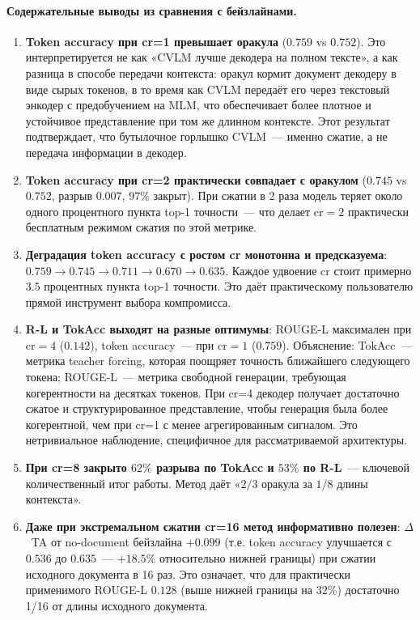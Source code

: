 \documentclass[a4paper,12pt]{extarticle}
\begin{document}
\paragraph{Содержательные выводы из сравнения с бейзлайнами.}
\begin{enumerate}
    \item \textbf{Token accuracy при cr=1 превышает оракула} ($0.759$ vs $0.752$). Это интерпретируется не как «CVLM лучше декодера на полном тексте», а как разница в способе передачи контекста: оракул кормит документ декодеру в виде сырых токенов, в то время как CVLM передаёт его через текстовый энкодер с предобучением на MLM, что обеспечивает более плотное и устойчивое представление при том же длинном контексте. Этот результат подтверждает, что бутылочное горлышко CVLM~--- именно сжатие, а не передача информации в декодер.

    \item \textbf{Token accuracy при cr=2 практически совпадает с оракулом} ($0.745$ vs $0.752$, разрыв $0.007$, $97\%$ закрыт). При сжатии в 2 раза модель теряет около одного процентного пункта top-1 точности~--- что делает $\text{cr}=2$ практически бесплатным режимом сжатия по этой метрике.

    \item \textbf{Деградация token accuracy с ростом cr монотонна и предсказуема}: $0.759 \to 0.745 \to 0.711 \to 0.670 \to 0.635$. Каждое удвоение cr стоит примерно $3.5$ процентных пункта top-1 точности. Это даёт практическому пользователю прямой инструмент выбора компромисса.

    \item \textbf{R-L и TokAcc выходят на разные оптимумы}: ROUGE-L максимален при $\text{cr}=4$ ($0.142$), token accuracy~--- при $\text{cr}=1$ ($0.759$). Объяснение: TokAcc~--- метрика teacher forcing, которая поощряет точность ближайшего следующего токена; ROUGE-L~--- метрика свободной генерации, требующая когерентности на десятках токенов. При cr=4 декодер получает достаточно сжатое и структурированное представление, чтобы генерация была более когерентной, чем при cr=1 с менее агрегированным сигналом. Это нетривиальное наблюдение, специфичное для рассматриваемой архитектуры.

    \item \textbf{При cr=8 закрыто $62\%$ разрыва по TokAcc и $53\%$ по R-L}~--- ключевой количественный итог работы. Метод даёт «$2/3$ оракула за $1/8$ длины контекста».

    \item \textbf{Даже при экстремальном сжатии cr=16 метод информативно полезен}: $\Delta$~TA от no-document бейзлайна $+0.099$ (т.е. token accuracy улучшается с $0.536$ до $0.635$~--- $+18.5\%$ относительно нижней границы) при сжатии исходного документа в 16 раз. Это означает, что для практически применимого ROUGE-L $0.128$ (выше нижней границы на $32\%$) достаточно 1/16 от длины исходного документа.
\end{enumerate}
\end{document}
